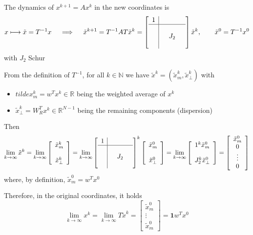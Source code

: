 \documentclass{book}
\newcommand{\R}{\mathbb{R}}
\newcommand{\N}{\mathbb{N}}
\theoremstyle{theoremv2}
\theoremstyle{defv2}
\theoremstyle{remark}
\theoremstyle{remark}
\theoremstyle{definition}
\theoremstyle{definition}
\begin{document}
The dynamics of $x^{k+1}=Ax^k$ in the new coordinates is 
\[
    x \longmapsto \tilde{x} = T^{-1}x \quad \implies \quad \tilde{x}^{k+1} = T^{-1}AT\tilde{x}^k = \left[\begin{array}{c| c c c }
        1 & & & \\ \hline \\ & & J_2 & \\ & & & 
    \end{array}\right] \tilde{x}^k, \qquad \tilde{x}^0 = T^{-1}x^0
\]
with $J_2$ Schur

From the definition of $T^{-1}$, for all $k\in\N$ we have $\tilde{x}^k=(\tilde{x}_m^k,\tilde{x}_\perp^k)$ with 
\begin{itemize}
    \item $tilde{x}_m^k = w^T x^k\in\R$ being the weighted average of $x^k$ 
    \item $\tilde{x}_\perp^k=W_R^Tx^k\in\R^{N-1}$ being the remaining components (dispersion) 
\end{itemize}
Then 
\[
    \lim_{k\to\infty} \tilde{x}^k = \lim_{k\to\infty} \left[\begin{array}{c}
        \tilde{x}_m^k \\ \\ \tilde{x}_\perp^k
    \end{array}\right] = \lim_{k\to\infty}\left[\begin{array}{c| c c c }
        1 & & & \\ \hline \\ & & J_2 & \\ & & & 
    \end{array}\right]^k \left[\begin{array}{c}
        \tilde{x}_m^0 \\ \\ \tilde{x}_\perp^0
    \end{array}\right] = \lim_{k\to\infty} \left[\begin{array}{c}
        1^k \tilde{x}_m^0 \\ \\ J_2^k\tilde{x}_\perp^0
    \end{array}\right] = \left[\begin{array}{c}
        \tilde{x}_m^0 \\ 0 \\ \vdots \\ 0
    \end{array}\right]
\]
where, by definition, $\tilde{x}_m^0=w^Tx^0$

Therefore, in the original coordinates, it holds 
\[
    \lim_{k\to\infty} x^k = \lim_{k\to\infty} T\tilde{x}^k = \left[\begin{array}{c}
        \tilde{x}_m^0 \\ \vdots \\ \tilde{x}_m^0
    \end{array}\right] = \boldsymbol{1}w^Tx^0
\]
\end{document}
